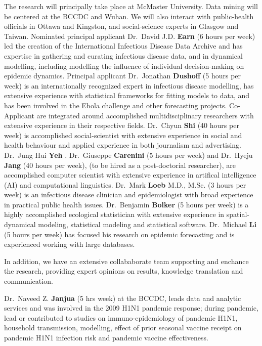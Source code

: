 The research will principally take place at McMaster University. Data mining will be centered at the BCCDC and Wuhan. We will also interact with public-health officials in Ottawa and Kingston, and social-science experts in Glasgow and Taiwan.
Nominated principal applicant Dr.\ David J.D. \textbf{Earn} (6 hours per week) led the creation of the International Infectious Disease Data Archive and has expertise in gathering and curating infectious disease data, and in dynamical modelling, including modelling the influence of individual decision-making on epidemic dynamics.
Principal applicant Dr.\ Jonathan \textbf{Dushoff} (5 hours per week) is an internationally recognized expert in infectious disease modelling, has extensive experience with statistical frameworks for fitting models to data, and has been involved in the Ebola challenge and other forecasting projects.
Co-Applicant are integrated around accomplished multidisciplinary researchers with extensive experience in their respective fields.
Dr.\ Chyun \textbf{Shi} (40 hours per week) is accomplished social-scientist with extensive experience in social and health behaviour and applied experience in both journalism and advertising. 
Dr.\ Jung Hui \textbf{Yeh} .
Dr.\ Giuseppe \textbf{Carenini} (5 hours per week) and Dr.\ Hyeju \textbf{Jang} (40 hours per week), (to be hired as a post-doctorial researcher), are accomplished computer scientist with extensive experience in artifical intelligence (AI) and computational linguistics.
Dr.\ Mark \textbf{Loeb} M.D., M.Sc. (3 hours per week) is an infectious disease clinician and epidemiologist with broad experience in practical public health issues.
Dr.\ Benjamin \textbf{Bolker} (5 hours per week) is a highly accomplished ecological statistician with extensive experience in spatial-dynamical modeling, statistical modeling and statistical software.
Dr.\ Michael \textbf{Li} (5 hours per week) has focused his research on epidemic forecasting and is experienced working with large databases. 

In addition, we have an extensive collababorate team supporting and enchance the research, providing expert opinions on results, knowledge translation and communication.

Dr.\ Naveed Z. \textbf{Janjua} (5 hrs week) at the BCCDC, leads data and analytic services and was involved in the 2009 H1N1 pandemic response; during pandemic, lead or contributed to studies on  immuno-epidemiology of pandemic H1N1, household transmission, modelling, effect of prior seasonal vaccine receipt on pandemic H1N1 infection risk and pandemic vaccine effectiveness. 

